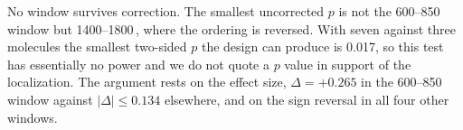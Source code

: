 \begin{table}[htbp]
\centering
\caption{The phosphorus contrast in each of the five windows, with the multiplicity of testing five windows made explicit. Two-sided Mann--Whitney on seven phosphorus-containing against three phosphorus-free agents.}
\label{tab:si-pfmult}
\footnotesize
{}

\begin{flushleft}\footnotesize No window survives correction. The smallest uncorrected $p$ is not the 600--850\,\wn{} window but 1400--1800\,\wn{}, where the ordering is reversed. With seven against three molecules the smallest two-sided $p$ the design can produce is 0.017, so this test has essentially no power and we do not quote a $p$ value in support of the localization. The argument rests on the effect size, $\Delta = +0.265$ in the 600--850\,\wn{} window against $|\Delta| \leq 0.134$ elsewhere, and on the sign reversal in all four other windows.\end{flushleft}
\end{table}
